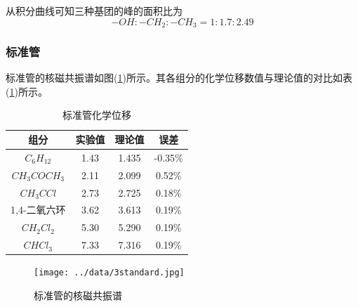 \documentclass[a4paper]{article}
\begin{document}
从积分曲线可知三种基团的峰的面积比为
\begin{equation*}
-OH : -CH_2 : -CH_3 = 1 : 1.7 : 2.49
\end{equation*}

\newpage
\subsubsection{标准管}
标准管的核磁共振谱如图(\ref{3standard})所示。其各组分的化学位移数值与理论值的对比如表(\ref{table1})所示。

\begin{table}[!h]
\centering
\caption{标准管化学位移}
\label{table1}
\begin{tabular}{|c|c|c|c|}
\hline
组分 & 实验值  & 理论值   & 误差      \\ \hline
$C_6H_{12}$   & 1.43 & 1.435 & -0.35\% \\ \hline
$CH_3COCH_3$   & 2.11 & 2.099 & 0.52\%  \\ \hline
$CH_3CCl$   & 2.73 & 2.725 & 0.18\%  \\ \hline
1,4-二氧六环   & 3.62 & 3.613 & 0.19\%  \\ \hline
$CH_2Cl_2$   & 5.30 & 5.290 & 0.19\%  \\ \hline
$CHCl_3$   & 7.33 & 7.316 & 0.19\%  \\ \hline
\end{tabular}
\end{table}

\begin{figure}[!h]
\centering
\texttt{[image: ../data/3standard.jpg]}\\
\caption{标准管的核磁共振谱}\label{3standard}
\end{figure}

\newpage
\end{document}
